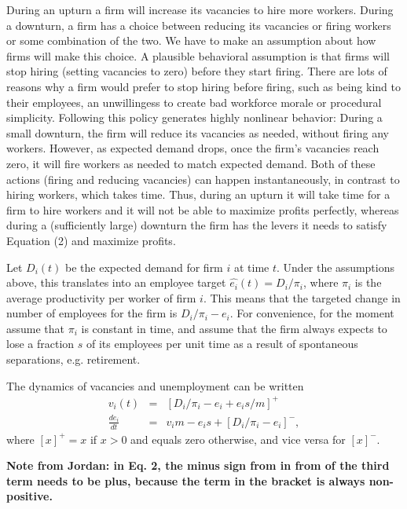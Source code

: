 During an upturn a firm will increase its vacancies to hire more workers.  During a downturn, a firm has a choice between reducing its vacancies or firing workers or some combination of the two.  We have to make an assumption about how firms will make this choice.   A plausible behavioral assumption is that firms will stop hiring (setting vacancies to zero) before they start firing.  There are lots of reasons why a firm would prefer to stop hiring before firing, such as being kind to their employees, an unwillingess to create bad workforce morale or procedural simplicity.  Following this policy generates highly nonlinear behavior:  During a small downturn, the firm will reduce its vacancies as needed, without firing any workers.  However, as expected demand drops, once the firm's vacancies reach zero, it will fire workers as needed to match expected demand.   Both of these actions (firing and reducing vacancies) can happen instantaneously, in contrast to hiring workers, which takes time. Thus, during an upturn it will take time for a firm to hire workers and it will not be able to maximize profits perfectly, whereas during a (sufficiently large) downturn the firm has the levers it needs to satisfy Equation (2) and maximize profits.

Let $D_i (t)$ be the expected demand for firm $i$ at time $t$.  Under the assumptions above, this translates into an employee target $\hat{e_i} (t) = D_i/\pi_i$, where $\pi_i$ is the average productivity per worker of firm $i$.  This means that the targeted change in number of employees for the firm is $D_i/\pi_i - e_i$.  For convenience, for the moment assume that $\pi_i$ is constant in time, and assume that the firm always expects to lose a fraction $s$ of its employees per unit time as a result of spontaneous separations, e.g. retirement.

The dynamics of vacancies and unemployment can be written
\begin{eqnarray}
v_i (t) & = & \left[ D_i/\pi_i - e_i + e_i s/m \right]^+ \label{vacancy}\\
\frac{de_i}{dt} & = & v_i m  - e_i s + \left[ D_i/\pi_i - e_i \right]^-\label{employmentchange},
\end{eqnarray}
where $[x]^+ = x$ if $x > 0$ and equals zero otherwise, and vice versa for $[x]^-$. 


\textbf{Note from Jordan: in Eq. 2, the minus sign from in from of the third term needs to be plus, because the term in the bracket is always non-positive.}

